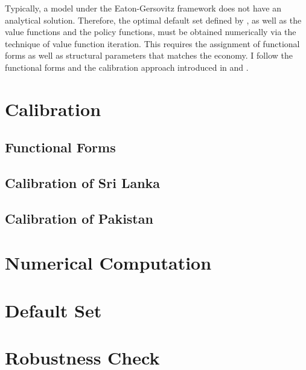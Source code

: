 Typically, a model under the Eaton-Gersovitz framework does not have an analytical solution. Therefore, the optimal default set defined by , as well as the value functions and the policy functions, must be obtained numerically via the technique of value function iteration.
This requires the assignment of functional forms as well as structural parameters that matches the economy.
I follow the functional forms and the calibration approach introduced in \citet{Na-18} and \citet{Hinrichsen_2020-chapter4}.

\section{Calibration}
\label{sec: calibration}

\subsection{Functional Forms}


\subsection{Calibration of Sri Lanka}


\subsection{Calibration of Pakistan}


\section{Numerical Computation}
\label{sec:computation}


\section{Default Set}


\section{Robustness Check}
